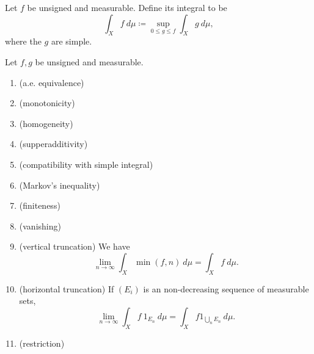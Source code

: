 \documentclass[12pt]{article}
\begin{document}
\begin{definition}
	Let $f$ be unsigned and measurable. Define its integral to be 
	\begin{equation*}
		\int_X f\ d\mu\coloneqq \sup_{0\leq g\leq f} \int_X g\ d\mu,
	\end{equation*}
	where the $g$ are simple.
\end{definition}

\begin{proposition}
	Let $f,g$ be unsigned and measurable. \hfill
	\begin{enumerate}
		\item (a.e. equivalence)
		\item (monotonicity)
		\item (homogeneity)
		\item (supperadditivity)
		\item (compatibility with simple integral)
		\item (Markov's inequality)
		\item (finiteness)
		\item (vanishing)
		\item (vertical truncation) We have 
			\begin{equation*}
				\lim_{n\to\infty}\int_X\min(f,n)\ d\mu=\int_X f\ d\mu.
			\end{equation*}
		\item (horizontal truncation) If $(E_i)$ is an non-decreasing sequence of measurable sets, 
			\begin{equation*}
				\lim_{n\to\infty}\int_X f\ 1_{E_n}\ d\mu=\int_X f 1_{\bigcup_n E_n}\ d\mu.
			\end{equation*}
		\item (restriction)
	\end{enumerate}
\end{proposition}
\end{document}

